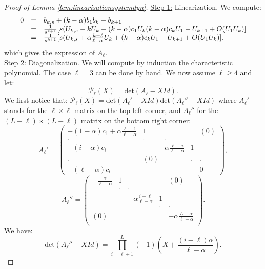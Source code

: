 \documentclass[11pt,a4paper,reqno]{amsart}
\theoremstyle{remark}
\numberwithin{equation}{section}
\begin{document}
\begin{proof}[Proof of Lemma \ref{lem:linearisationsystemdyn}]
 \underline{Step 1:} Linearization. We compute:
$$
\begin{array}{ r c l}
0&=& b_{k,s}+(k-\alpha)b_1b_k-b_{k+1} \\
&=&\frac{1}{s^{k+1}}[s(U_{k,s}-kU_k+(k-\alpha)c_1 U_k (k-\alpha)c_k U_1-U_{k+1}+O(U_1 U_k)] \\
&=&\frac{1}{s^{k+1}}[s(U_{k,s}+\alpha\frac{k-\ell}{\ell-\alpha}U_k+(k-\alpha)c_k U_1-U_{k+1}+O(U_1 U_k)] .
\end{array}
$$
which gives the expression of $A_{\ell}$.\\

\underline{Step 2:} Diagonalization. We will compute by induction the characteristic polynomial. The case $\ell=3$ can be done by hand. We now assume $\ell\geq 4$ and let:
$$
\mathcal{P}_{\ell}(X)=\text{det}(A_{\ell}-XId) .
$$
We first notice that: $\mathcal{P}_{\ell}(X)=\text{det}(A_{\ell}'-XId)\text{det}(A_{\ell}''-XId)$ where $A_{\ell}'$ stands for the $\ell\times \ell$ matrix on the top left corner, and $A_{\ell}''$ for the $(L- \ell)\times (L-\ell)$ matrix on the bottom right corner:
\begin{equation}
A_{\ell}'=\begin{pmatrix} -(1-\alpha)c_1 +\alpha \frac{\ell-1}{\ell-\alpha} & 1 &  & & (0)  \\ . & . & . & &   \\ -(i-\alpha)c_i & & \alpha\frac{\ell-i}{\ell-\alpha} & 1 &   \\ . & (0) & & . &.   \\ -(\ell-\alpha)c_l & & & & 0  \end{pmatrix} ,
\end{equation}
\begin{equation}
A_{\ell}''=\begin{pmatrix}
-\frac{\alpha}{\ell-\alpha}& 1 & & &(0) \\
 &\cdot & \cdot & & \\
& & -\alpha\frac{i-\ell}{\ell-\alpha}& 1& \\
& & & \cdot& \cdot \\
(0) & & & & -\alpha \frac{L-\alpha}{\ell-\alpha}\\
\end{pmatrix}.
\end{equation}
We have:
\begin{equation}
\text{det}(A_{\ell}''-XId)=\prod_{i=\ell+1}^L (-1)\left(X+\frac{(i-\ell)\alpha}{\ell-\alpha}\right) .
\end{equation}

\end{proof}
\end{document}
